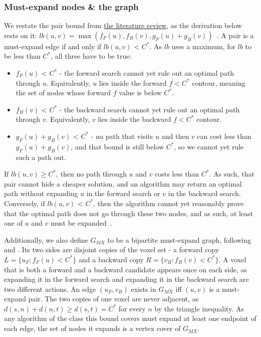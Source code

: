 \documentclass[letterpaper]{article} %
\begin{document}
\subsubsection{Must-expand nodes \& the graph}
We restate the pair bound from \hyperref[sec:litrev]{the literature review}, as the derivation below rests on it: $lb(u,v)=\max(f_F(u), f_B(v), g_F(u) + g_B(v))$~\cite{eckerle2017sufficient}. A pair is a must-expand edge if and only if $lb(u,v)$ < $C^*$. As $lb$ uses a maximum, for $lb$ to be less than $C^*$, all three have to be true:
\begin{itemize}
  \item $f_F(u)$ < $C^*$ - the forward search cannot yet rule out an optimal path through $u$. Equivalently, $u$ lies inside the forward $f<C^*$ contour, meaning the set of nodes whose forward $f$ value is below $C^*$.
  \item $f_B(v)$ < $C^*$ - the backward search cannot yet rule out an optimal path through $v$. Equivalently, $v$ lies inside the backward $f<C^*$ contour.
  \item $g_F(u) + g_B(v)$ < $C^*$ - no path that visits $u$ and then $v$ can cost less than $g_F(u)+g_B(v)$, and that bound is still below $C^*$, so we cannot yet rule such a path out.
\end{itemize} If $lb(u,v)\ge C^*$, then no path through $u$ and $v$ costs less than $C^*$. As such, that pair cannot hide a cheaper solution, and an algorithm may return an optimal path without expanding $u$ in the forward search or $v$ in the backward search. Conversely, if $lb(u,v)$ < $C^*$, then the algorithm cannot yet reasonably prove that the optimal path does not go through these two nodes, and as such, at least one of $u$ and $v$ must be expanded~\cite{eckerle2017sufficient}.

Additionally, we also define $G_{MX}$ to be a bipartite must-expand graph, following \citet{chen2017nbs} and \citet{shaham2017minimal}. Its two sides are disjoint copies of the voxel set - a forward copy $L=\{u_F: f_F(u) < C^*\}$ and a backward copy $R=\{v_B: f_B(v) < C^*\}$. A voxel that is both a forward and a backward candidate appears once on each side, as expanding it in the forward search and expanding it in the backward search are two different actions. An edge $(u_F,v_B)$ exists in $G_{MX}$ iff $(u,v)$ is a must-expand pair. The two copies of one voxel are never adjacent, as $d(s,n)+d(n,t)\ge d(s,t)=C^*$ for every $n$ by the triangle inequality. As any algorithm of the class this bound covers must expand at least one endpoint of each edge, the set of nodes it expands is a vertex cover of $G_{MX}$.
\end{document}
